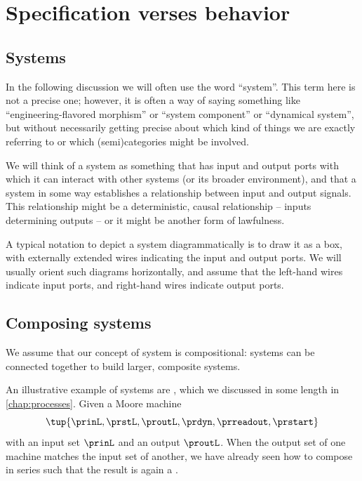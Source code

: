 
\section{Specification verses behavior}

\subsection{Systems}

In the following discussion we will often use the word ``system''.
This term here is not a precise one; however, it is often a way of saying something like ``engineering-flavored morphism'' or ``system component'' or ``dynamical system'', but without necessarily getting precise about which kind of things we are exactly referring to or which (semi)categories might be involved.

We will think of a system as something that has input and output ports with which it can interact with other systems (or its broader environment), and that a system in some way establishes a relationship between input and output signals.
This relationship might be a deterministic, causal relationship -- inputs determining outputs -- or it might be another form of lawfulness.

A typical notation to depict a system diagrammatically is to draw it as a box, with externally extended wires indicating the input and output ports.
We will usually orient such diagrams horizontally, and assume that the left-hand wires indicate input ports, and right-hand wires indicate output ports.


\subsection{Composing systems}

We assume that our concept of system is compositional: systems can be connected together to build larger, composite systems.

An illustrative example of systems are , which we discussed in some length in \cref{chap:processes}.
Given a Moore machine
\begin{equation}
    \label{eq:moore-machine-specification}
    \tup{\prinL,\prstL,\proutL,\prdyn,\prreadout,\prstart}
\end{equation}
with an input set $\prinL$ and an output $\proutL$.
When the output set of one machine matches the input set of another, we have already seen how to compose  in series such that the result is again a .

